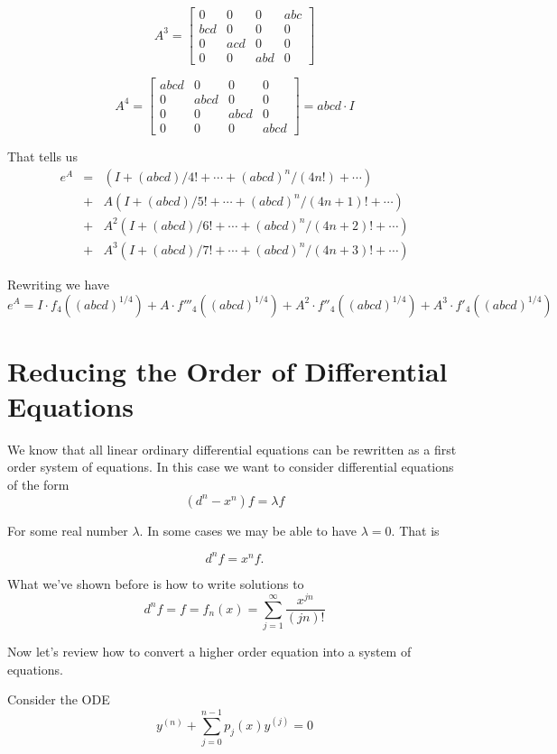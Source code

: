\documentclass{amsart}
\theoremstyle{definition}
\theoremstyle{remark}
\numberwithin{equation}{section}
\begin{document}
\[
A^3 = \begin{bmatrix}
0 & 0 & 0 & abc\\
bcd & 0 & 0 & 0\\
0 & acd & 0 & 0\\
0 & 0 & abd & 0
\end{bmatrix}
\]

\[
A^4 = \begin{bmatrix}
abcd& 0 & 0 & 0\\
0 & abcd & 0 & 0\\
0 & 0 & abcd & 0\\
0 & 0 & 0 & abcd
\end{bmatrix} = abcd\cdot I
\]


That tells us
\begin{eqnarray}
e^A & = & (I + (abcd)/4! + \cdots + (abcd)^n/(4n!) + \cdots)\\\nonumber
& + & A(I + (abcd)/5! + \cdots + (abcd)^n/(4n+1)! + \cdots )\\\nonumber
& + & A^2(I + (abcd)/6! + \cdots + (abcd)^n/(4n+2)! + \cdots )\\\nonumber
& + & A^3(I + (abcd)/7! + \cdots + (abcd)^n/(4n+3)! + \cdots )  
\end{eqnarray}


Rewriting we have
\[
e^A = I\cdot f_4((abcd)^{1/4}) + A\cdot f'''_4((abcd)^{1/4})+A^2\cdot f''_4((abcd)^{1/4})+A^3\cdot f'_4((abcd)^{1/4})
\]



\section{Reducing the Order of Differential Equations}

We know that all linear ordinary differential equations can be rewritten as a first order system of equations.  In this case we want to consider differential equations of the form
\[
(d^n - x^n)f = \lambda f
\]

For some real number $\lambda$.  In some cases we may be able to have $\lambda=0$.  That is

\[
d^n f = x^n f.
\]

What we've shown before is how to write solutions to 
\[
d^n f =f  = f_n(x) = \sum_{j=1}^{\infty} \frac{x^{jn}}{(jn)!}
\]

Now let's review how to convert a higher order equation into a system of equations.

Consider the ODE
\[
y^{(n)} + \sum_{j=0}^{n-1} p_j(x) y^{(j)} = 0
\]
\end{document}
